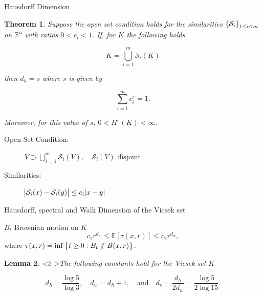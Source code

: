 \documentclass{beamer}
\newcounter{chapCount}
\newtheorem{theorems}{Theorem}[chapCount]
\newtheorem{lem}[theorems]{Lemma}
\newcommand{\ree}{\mathbb{R}}
\newcommand{\e}{\mathbb{E}}
\newcommand{\fracConst}{\mathcal{S}}
\begin{document}
	\begin{frame}{Hausdorff Dimension}
		
		\setcounter{chapCount}{1}
		\vspace{3em}
		\begin{theorems}
			Suppose the open set condition holds for the similarities $\cbr{\fracConst_i}_{1 \leq i \leq m}$ on $\ree^{n}$ with ratios $0 < c_i < 1$. If, for $K$ the following holds
			
			\vspace{-1em}
			\begin{equation}\label{hausDorffDimCondition}
				K = \bigcup_{i = 1}^{m} \fracConst_i(K)
			\end{equation}
			
			\vspace{-0.5em}
			then $d_h = s$ where $s$ is given by
			
			\vspace{-1em}
			\begin{equation}\label{hausDorffDimRatioSum}
				\sum_{i = 1}^{m} c_i^{s} = 1.
			\end{equation}
			
			\vspace{-0.5em}
			Moreover, for this value of $s$, $0 < H^s(K) < \infty$.
		\end{theorems}
		
		\pause

		\begin{description}
			\item[Open Set Condition: ] 	
				$ V \supset \bigcup_{i = 1}^{m} \fracConst_i(V), \quad \fracConst_i(V) \text{ disjoint}$
				
				\item[Similarities: ] $\abs{\fracConst_i(x) - \fracConst_i(y)} \leq c_i \abs{x-y}$
		\end{description}
	\end{frame}
	
	\begin{frame}{Hausdorff, spectral and Walk Dimension of the Vicsek set}
		\begin{description}
			\item<1->[Walk Dimension: ] $B_t$ Brownian motion on $K$
			\begin{equation}
				c_1 r^{d_w} \leq \e \left[\tau(x,r)\right] \leq c_2 r^{d_w},
			\end{equation}
			where $\tau(x,r) = \inf\cbr{t \geq 0 : B_t \notin B(x,r)}$.
		\end{description}
			\setcounter{theorems}{13}
		\begin{lem}<2->\label{defiDimensionsOfVicsek}
			The following constants hold for the Vicsek set $K$
			
			\vspace{-1em}
			\begin{equation}
				d_h= \frac{\log 5}{\log 3}, \quad d_w = d_h +1, \quad \text{and} \quad d_s = \frac{d_h}{2d_w} = \frac{\log 5}{2 \log 15}.
			\end{equation}
		\end{lem}
		
	\end{frame}
	
\end{document}
